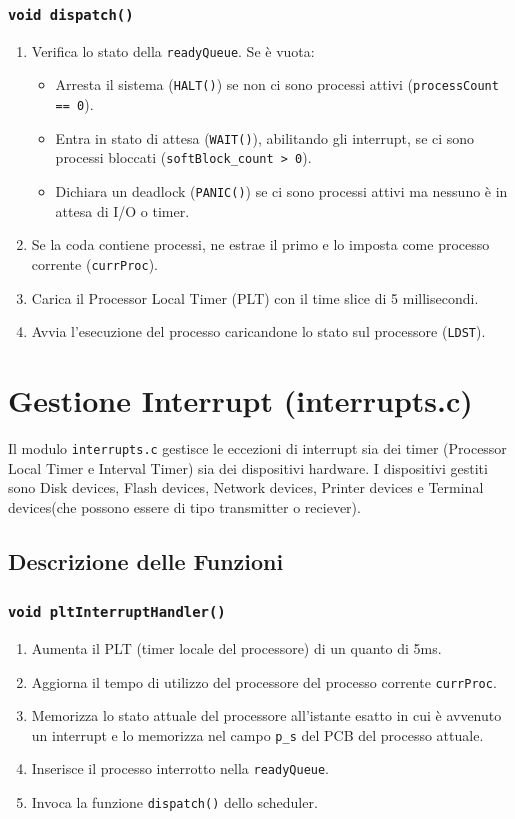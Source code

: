 \documentclass[a4paper,12pt]{article}
\begin{document}
\subsubsection{\texttt{void dispatch()}}
\begin{enumerate}
    \item Verifica lo stato della \texttt{readyQueue}. Se è vuota:
    \begin{itemize}
        \item Arresta il sistema (\texttt{HALT()}) se non ci sono processi attivi (\texttt{processCount == 0}).
        \item Entra in stato di attesa (\texttt{WAIT()}), abilitando gli interrupt, se ci sono processi bloccati (\texttt{softBlock\_count > 0}).
        \item Dichiara un deadlock (\texttt{PANIC()}) se ci sono processi attivi ma nessuno è in attesa di I/O o timer.
    \end{itemize}
    \item Se la coda contiene processi, ne estrae il primo e lo imposta come processo corrente (\texttt{currProc}).
    \item Carica il Processor Local Timer (PLT) con il time slice di 5 millisecondi.
    \item Avvia l'esecuzione del processo caricandone lo stato sul processore (\texttt{LDST}).
\end{enumerate}

\section{Gestione Interrupt (interrupts.c)}
Il modulo \texttt{interrupts.c} gestisce le eccezioni di interrupt sia dei timer (Processor Local Timer e Interval Timer) sia dei dispositivi hardware. I dispositivi gestiti sono Disk devices, Flash devices, Network devices, Printer devices e Terminal devices(che possono essere di tipo transmitter o reciever).

\vspace{0.5cm}
\subsection{Descrizione delle Funzioni}

\subsubsection{\texttt{void pltInterruptHandler()}}
\begin{enumerate}
    \item Aumenta il PLT (timer locale del processore) di un quanto di 5ms.
    \item Aggiorna il tempo di utilizzo del processore del processo corrente \texttt{currProc}.
    \item Memorizza lo stato attuale del processore all'istante esatto in cui è avvenuto un interrupt e lo memorizza nel campo \texttt{p\_s} del PCB del processo attuale.
    \item Inserisce il processo interrotto nella \texttt{readyQueue}.
    \item Invoca la funzione \texttt{dispatch()} dello scheduler. 
\end{enumerate}
\end{document}
